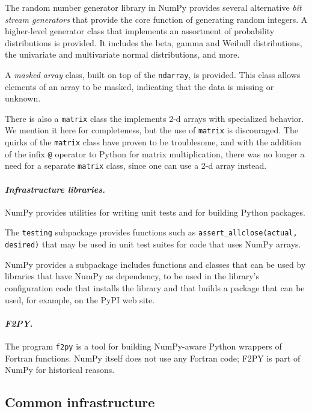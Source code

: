 \documentclass[fleqn,10pt]{wlscirep}
\newcommand{\code}[1]{\texttt{#1}}
\begin{document}
The random number generator library in NumPy provides several alternative
\emph{bit stream generators} that provide the core function of generating
random integers.
A higher-level generator class that implements an assortment of
probability distributions is provided. It includes the beta, gamma
and Weibull distributions, the univariate and multivariate normal
distributions, and more.

A \emph{masked array} class, built on top of the \code{ndarray}, is
provided.  This class allows elements of an array to be masked,
indicating that the data is missing or unknown.

There is also a \code{matrix} class the implements 2-d arrays with
specialized behavior.  We mention it here for completeness, but the
use of \code{matrix} is discouraged.  The quirks of the \code{matrix}
class have proven to be troublesome, and with the addition of the
infix \code{@} operator to Python for matrix multiplication, there was no
longer a need for a separate \code{matrix} class, since one can
use a 2-d array instead.

\paragraph{\emph{Infrastructure libraries.}} NumPy provides utilities
for writing unit tests and for building Python packages.

The \code{testing} subpackage provides functions such as
\code{assert\_allclose(actual, desired)} that may be used in unit
test suites for code that uses NumPy arrays.

NumPy provides a subpackage includes functions and classes
that can be used by libraries that have NumPy as dependency,
to be used in the library's configuration code that installs the
library and that builds a package that can be used, for example,
on the PyPI web site.

\paragraph{\emph{F2PY.}}  The program \code{f2py} is a tool for
building NumPy-aware Python wrappers of Fortran functions.
NumPy itself does not use any Fortran code;  F2PY is part of NumPy
for historical reasons.

\subsection*{Common infrastructure}
\end{document}
